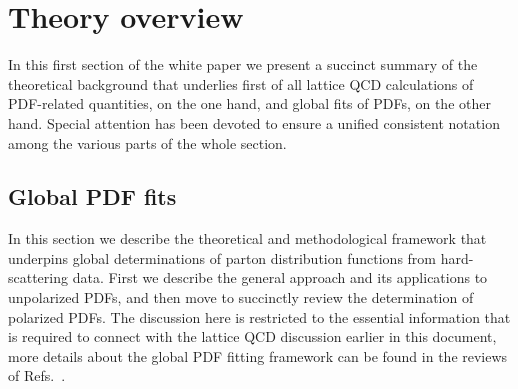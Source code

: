 
\section{Theory overview}
\label{sec:theoryoverview}

In this first section of the white paper we present a succinct
summary of the theoretical background that underlies
first of all lattice QCD calculations of PDF-related
quantities, on the one hand, and global fits
of PDFs, on the other hand.
%
Special attention has been devoted to ensure a unified
consistent notation among the various parts of the whole section.




\subsection{Global PDF fits}

In this section we describe the theoretical and methodological framework that underpins global
determinations of parton distribution functions from hard-scattering data.
%
First we describe the general approach and its applications to unpolarized PDFs, and then
move to succinctly review the determination of polarized PDFs.
%
The discussion here is restricted to the essential information that is required to connect
with the lattice QCD discussion earlier in this document, more details about the
global PDF fitting framework can be found in the reviews of
Refs.~\cite{Ball:2012wy,Forte:2013wc,Rojo:2015acz,Butterworth:2015oua}.





